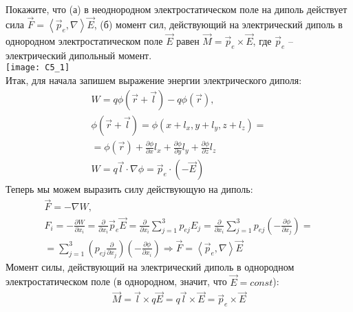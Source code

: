 \documentclass[__main__.tex]{subfiles}
\begin{document}
Покажите, что (а) в неоднородном электростатическом поле на диполь действует сила $\vec{F}=\left<\vec{p}_e,\nabla\right>\vec{E}$, (б) момент сил, действующий на электрический диполь в однородном электростатическом поле $\vec{E}$ равен $\vec{M}=\vec{p}_e\times\vec{E}$, где $\vec{p}_e$ -- электрический дипольный момент.\\ 
\texttt{[image: C5\_1]}\\
Итак, для начала запишем выражение энергии электрического диполя:\\
\begin{gather*}
W = q\phi(\vec{r}+\vec{l})-q\phi(\vec{r}),\\
\phi(\vec{r}+\vec{l}) = \phi(x+l_x,y+l_y,z+l_z)=\\
=\phi(\vec{r})+\frac{\partial \phi}{\partial x}l_x+\frac{\partial \phi}{\partial y}l_y+\frac{\partial \phi}{\partial z}l_z\\
W = q\vec{l} \cdot \nabla \phi = \vec{p}_{e} \cdot (-\vec{E})
\end{gather*}
Теперь мы можем выразить силу действующую на диполь:\\
\begin{gather*}
\vec{F} = -\nabla W,\\
F_i = -\frac{\partial W}{\partial x_i} = \frac{\partial}{\partial x_i}\vec{p}_{e}\vec{E}=\frac{\partial}{\partial x_i}\sum_{j=1}^{3}p_{ej}E_j = \frac{\partial}{\partial x_i} \sum_{j=1}^{3}p_{ej}\left(-\frac{\partial \phi}{\partial x_j}\right) = \\ = \sum_{j=1}^{3}\left(p_{ej}\frac{\partial}{\partial x_j}\right)\left(-\frac{\partial \phi}{\partial x_i}\right) \Longrightarrow \vec{F} = \left<\vec{p}_{e}, \nabla\right>\vec{E}
\end{gather*}
Момент силы, действующий на электрический диполь в однородном электростатическом поле (в однородном, значит, что $\vec{E} = const$):
\begin{gather}
\vec{M} = \vec{l} \times q\vec{E} = q\vec{l}\times\vec{E} = \vec{p}_{e}\times\vec{E}
\end{gather}
\end{document}
